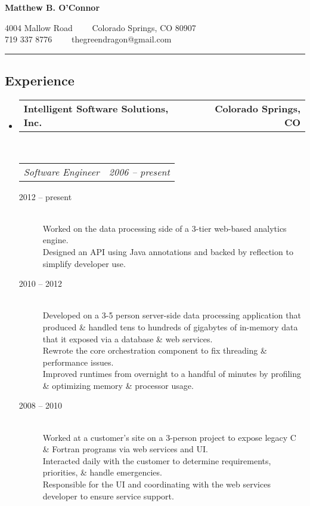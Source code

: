 \documentclass[10pt,letterpaper]{article}
\makeatletter
\newcommand{\headerrow}[2]
{\begin{tabular*}{\linewidth}{l@{\extracolsep{\fill}}r}
	#1 &
	#2 \\
\end{tabular*}}
\makeatother
\begin{document}
\begin{center}
{\LARGE \textbf{Matthew B. O'Connor}}

4004 Mallow Road\ \ \textbullet
\ \ Colorado Springs, CO 80907
\\
719 337 8776\ \ \textbullet
\ \ thegreendragon@gmail.com
\end{center}

\hrule
\vspace{-0.4em}
\subsection*{Experience}

\begin{itemize}
	\parskip=0.1em

	\item
	\headerrow
		{\textbf{Intelligent Software Solutions, Inc.}}
		{\textbf{Colorado Springs, CO}}
	\\
	\headerrow
		{\emph{Software Engineer}}
		{\emph{2006 -- present}}
	\begin{description}
		\item[2012 -- present] \hfill \\ %
				Worked on the data processing side of a 3-tier web-based analytics engine. \\
				Designed an API using Java annotations and backed by reflection to simplify developer use.
		\item[2010 -- 2012] \hfill \\ %
				Developed on a 3-5 person server-side data processing application that produced \& handled tens to hundreds of gigabytes of in-memory data that it exposed via a database \& web services. \\
				Rewrote the core orchestration component to fix threading \& performance issues. \\
				Improved runtimes from overnight to a handful of minutes by profiling \& optimizing memory \& processor usage.
		\item[2008 -- 2010] \hfill \\ %
				Worked at a customer's site on a 3-person project to expose legacy C \& Fortran programs via web services and UI. \\
				Interacted daily with the customer to determine requirements, priorities, \& handle emergencies. \\
				Responsible for the UI and coordinating with the web services developer to ensure service support. \\

\end{description}
\end{itemize}
\end{document}
